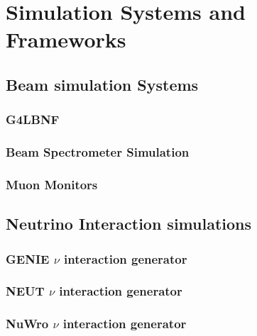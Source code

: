 %
\chapter{Simulation Systems and Frameworks}  %
\section{Beam simulation Systems}

\subsection{G4LBNF}

\subsection{Beam Spectrometer Simulation}

\subsection{Muon Monitors}

\section{Neutrino Interaction simulations}

\subsection{GENIE $\nu$ interaction generator}

\subsection{NEUT $\nu$ interaction generator}

\subsection{NuWro $\nu$ interaction generator}

